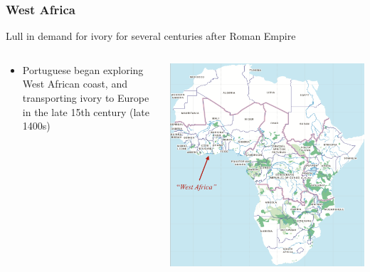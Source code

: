 \documentclass[10pt]{beamer}
\begin{document}
\begin{frame}[t]
\frametitle{West Africa}
\vspace{0.5cm}
	
	Lull in demand for ivory for several centuries after Roman Empire\\
	
	\begin{columns}
		\begin{column}{0.5\textwidth}
			\begin{itemize}
				\item Portuguese began exploring West African coast, and transporting ivory to Europe in the late 15th century (late 1400s)
			\end{itemize}
		\end{column}
		
		\begin{column}{0.5\textwidth}
			\begin{center}
				\includegraphics[width=1.0\textwidth]{figures/west1.png}
			\end{center}
		\end{column}	
	\end{columns}
	
\end{frame}
\end{document}
